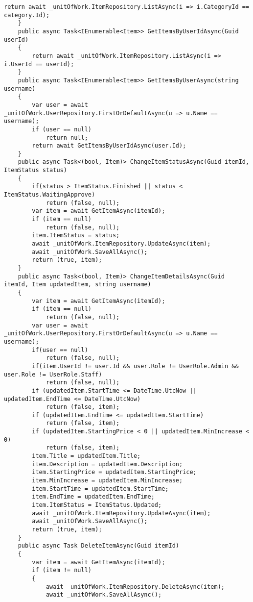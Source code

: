 \begin{lstlisting}[style=csharpinlinestyle]
        return await _unitOfWork.ItemRepository.ListAsync(i => i.CategoryId == category.Id);
    }
    public async Task<IEnumerable<Item>> GetItemsByUserIdAsync(Guid userId)
    {
        return await _unitOfWork.ItemRepository.ListAsync(i => i.UserId == userId);
    }
    public async Task<IEnumerable<Item>> GetItemsByUserAsync(string username)
    {
        var user = await _unitOfWork.UserRepository.FirstOrDefaultAsync(u => u.Name == username);
        if (user == null)
            return null;
        return await GetItemsByUserIdAsync(user.Id);
    }
    public async Task<(bool, Item)> ChangeItemStatusAsync(Guid itemId, ItemStatus status)
    {
        if(status > ItemStatus.Finished || status < ItemStatus.WaitingApprove)
            return (false, null);
        var item = await GetItemAsync(itemId);
        if (item == null)
            return (false, null);
        item.ItemStatus = status;
        await _unitOfWork.ItemRepository.UpdateAsync(item);
        await _unitOfWork.SaveAllAsync();
        return (true, item);
    }
    public async Task<(bool, Item)> ChangeItemDetailsAsync(Guid itemId, Item updatedItem, string username)
    {
        var item = await GetItemAsync(itemId);
        if (item == null)
            return (false, null);
        var user = await _unitOfWork.UserRepository.FirstOrDefaultAsync(u => u.Name == username);
        if(user == null)
            return (false, null);
        if(item.UserId != user.Id && user.Role != UserRole.Admin && user.Role != UserRole.Staff)
            return (false, null);
        if (updatedItem.StartTime <= DateTime.UtcNow || updatedItem.EndTime <= DateTime.UtcNow)
            return (false, item);
        if (updatedItem.EndTime <= updatedItem.StartTime)
            return (false, item);
        if (updatedItem.StartingPrice < 0 || updatedItem.MinIncrease < 0)
            return (false, item);
        item.Title = updatedItem.Title;
        item.Description = updatedItem.Description;
        item.StartingPrice = updatedItem.StartingPrice;
        item.MinIncrease = updatedItem.MinIncrease;
        item.StartTime = updatedItem.StartTime;
        item.EndTime = updatedItem.EndTime;
        item.ItemStatus = ItemStatus.Updated;
        await _unitOfWork.ItemRepository.UpdateAsync(item);
        await _unitOfWork.SaveAllAsync();
        return (true, item);
    }
    public async Task DeleteItemAsync(Guid itemId)
    {
        var item = await GetItemAsync(itemId);
        if (item != null)
        {
            await _unitOfWork.ItemRepository.DeleteAsync(item);
            await _unitOfWork.SaveAllAsync();

\end{lstlisting}
